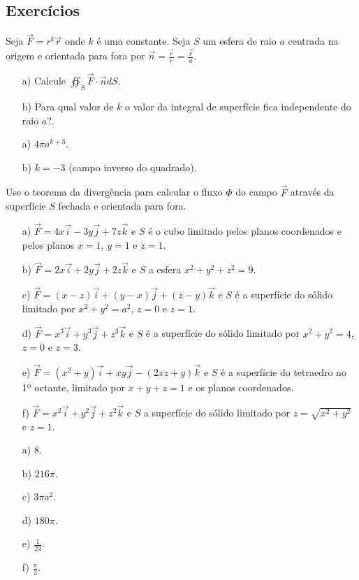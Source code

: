 \subsection*{Exercícios}
\begin{exer}
 Seja $\vec{F}=r^k\vec{r}$ onde $k$ é uma constante. Seja $S$ um esfera de raio $a$ centrada na origem e orientada para fora por $\vec{n}=\frac{\vec{r}}{r}=\frac{\vec{r}}{a}$. 
 \begin{itemize}
  \item[a)] Calcule $\oiint_S\vec{F}\cdot \vec{n}dS$.
  \item[b)] Para qual valor de $k$ o valor da integral de superfície fica independente do raio $a$?.
 \end{itemize}
\end{exer}
\begin{resp}
 \begin{itemize}
  \item[a)] $4\pi a^{k+3}$.
  \item[b)] $k=-3$ (campo inverso do quadrado).
 \end{itemize} 
\end{resp}

\begin{exer}
 Use o teorema da divergência para calcular o fluxo $\Phi$ do campo $\vec{F}$ através da superfície $S$ fechada e orientada para fora.
 \begin{itemize}
  \item[a)] $\vec{F}=4x\vec{i}-3y\vec{j}+7z\vec{k}$ e $S$ é o cubo limitado pelos planos coordenados e pelos planos $x=1$, $y=1$ e $z=1$.
  \item[b)] $\vec{F}=2x\vec{i}+2y\vec{j}+2z\vec{k}$ e $S$ a esfera $x^2+y^2+z^2=9$.
  \item[c)] $\vec{F}=(x-z)\vec{i}+(y-x)\vec{j}+(z-y)\vec{k}$ e $S$ é a superfície do sólido limitado por $x^2+y^2=a^2$, $z=0$ e $z=1$.
  \item[d)] $\vec{F}=x^3\vec{i}+y^3\vec{j}+z^3\vec{k}$ e $S$ é a superfície do sólido limitado por $x^2+y^2=4$, $z=0$ e $z=3$.
  \item[e)] $\vec{F}=(x^2+y)\vec{i}+xy\vec{j}-(2xz+y)\vec{k}$ e $S$ é a superfície do tetraedro no 1º octante, limitado por $x+y+z=1$ e os planos coordenados.
  \item[f)] $\vec{F}=x^2\vec{i}+y^2\vec{j}+z^2\vec{k}$ e $S$ a superfície do sólido limitado por $z=\sqrt{x^2+y^2}$ e $z=1$.
 \end{itemize}
\end{exer}
\begin{resp}
\begin{itemize}
 \item[a)] $8$.
 \item[b)] $216\pi$. 
 \item[c)] $3\pi a^2$. 
 \item[d)] $180\pi$.
 \item[e)] $\frac{1}{24}$. 
 \item[f)] $\frac{\pi}{2}$. 
\end{itemize}
\end{resp}



